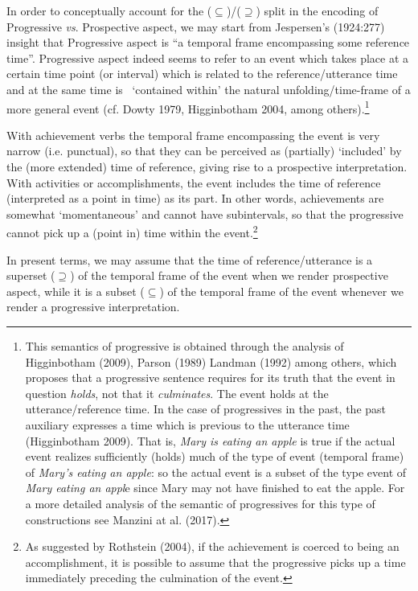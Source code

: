\documentclass[12pt]{article}
\newenvironment{styleStandard}{\setlength\leftskip{0cm}\setlength\rightskip{0cm plus 1fil}\setlength\parindent{0cm}\setlength\parfillskip{0pt plus 1fil}\setlength\parskip{0in plus 1pt}\writerlistparindent\writerlistleftskip\leavevmode\normalfont\normalsize\writerlistlabel\ignorespaces}{\unskip\vspace{0.111in plus 0.0111in}\par}
\newcommand\writerlistleftskip{}
\newcommand\writerlistparindent{}
\newcommand\writerlistlabel{}
\begin{document}
\begin{styleStandard}
In order to conceptually account for the (${\subseteq}$)/(${\supseteq}$) split in the encoding of Progressive \textit{vs}. Prospective aspect, we may start from Jespersen’s (1924:277) insight that Progressive aspect is “a temporal frame encompassing some reference time”. Progressive aspect indeed seems to refer to an event which takes place at a certain time point (or interval) which is related to the reference/utterance time and at the same time is \ ‘contained within’ the natural unfolding/time-frame of a more general event (cf. Dowty 1979, Higginbotham 2004, among others).\footnote{ This semantics of progressive is obtained through the analysis of Higginbotham (2009), Parson (1989) Landman (1992) among others, which proposes that a progressive sentence requires for its truth that the event in question \textit{holds}, not that it \textit{culminates}. The event holds at the utterance/reference time. In the case of progressives in the past, the past auxiliary expresses a time which is previous to the utterance time (Higginbotham 2009). That is, \textit{Mary is eating an apple} is true if the actual event realizes sufficiently (holds) much of the type of event (temporal frame) of \textit{Mary’s eating an apple}: so the actual event is a subset of the type event of \textit{Mary eating an appl}e since Mary may not have finished to eat the apple. For a more detailed analysis of the semantic of progressives for this type of constructions see Manzini at al. (2017).} 
\end{styleStandard}

\begin{styleStandard}
With achievement verbs the temporal frame encompassing the event is very narrow (i.e. punctual), so that they can be perceived as (partially) ‘included’ by the (more extended) time of reference, giving rise to a prospective interpretation. With activities or accomplishments, the event includes the time of reference (interpreted as a point in time) as its part. In other words, achievements are somewhat ‘momentaneous’ and cannot have subintervals, so that the progressive cannot pick up a (point in) time within the event.\footnote{ As suggested by Rothstein (2004), if the achievement is coerced to being an accomplishment, it is possible to assume that the progressive picks up a time immediately preceding the culmination of the event.} 
\end{styleStandard}

\begin{styleStandard}
In present terms, we may assume that the time of reference/utterance is a superset (${\supseteq}$) of the temporal frame of the event when we render prospective aspect, while it is a subset (${\subseteq}$) of the temporal frame of the event whenever we render a progressive interpretation.
\end{styleStandard}
\end{document}
